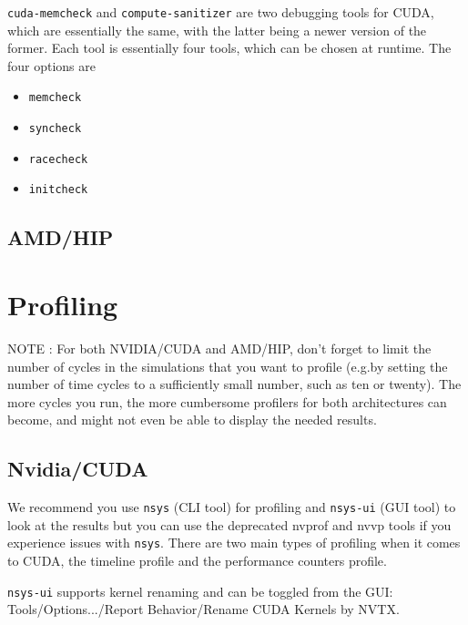 \documentclass[a4paper,11pt]{article}
\begin{document}
\texttt{cuda-memcheck} and \texttt{compute-sanitizer} are two debugging tools for CUDA, which are essentially the same, with the latter being a newer version of the former. Each tool is essentially four tools, which can be chosen at runtime. The four options are
\begin{itemize}
    \item \texttt{memcheck}
    \item \texttt{syncheck}
    \item \texttt{racecheck}
    \item \texttt{initcheck}
\end{itemize}

\subsection{AMD/HIP}

\section{Profiling}

NOTE : For both NVIDIA/CUDA and AMD/HIP, don't forget to limit the number of cycles in the simulations that you want to profile (e.g.\@ by setting the number of time cycles to a sufficiently small number, such as ten or twenty). The more cycles you run, the more cumbersome profilers for both architectures can become, and might not even be able to display the needed results.

\subsection{Nvidia/CUDA}

We recommend you use \texttt{nsys} (CLI tool) for profiling and \texttt{nsys-ui} (GUI tool) to look at the results but you can use the deprecated nvprof and nvvp tools if you experience issues with \texttt{nsys}. There are two main types of profiling when it comes to CUDA, the timeline profile and the performance counters profile.

\texttt{nsys-ui} supports kernel renaming and can be toggled from the GUI: Tools/Options.../Report Behavior/Rename CUDA Kernels by NVTX.
\end{document}
